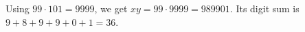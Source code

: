 Using $99\cdot101=9999$, we get $xy=99\cdot9999=989901$. Its digit sum is $9+8+9+9+0+1=\boxed{36}$.
